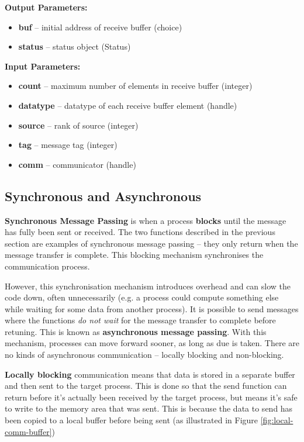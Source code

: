 \documentclass{article}
\begin{document}
\textbf{Output Parameters:}
\begin{itemize}
	\item \textbf{buf} -- initial address of receive buffer (choice)
	\item \textbf{status} -- status object (Status)
\end{itemize}
\textbf{Input Parameters:}
\begin{itemize}
	\item \textbf{count} -- maximum number of elements in receive buffer (integer)
	\item \textbf{datatype} -- datatype of each receive buffer element (handle)
	\item \textbf{source} -- rank of source (integer)
	\item \textbf{tag} -- message tag (integer)
	\item \textbf{comm} -- communicator (handle)
\end{itemize}

\subsection{Synchronous and Asynchronous}

\textbf{Synchronous Message Passing} is when a process \textbf{blocks} until the message has fully been sent or received. The two functions described in the previous section are examples of synchronous message passing -- they only return when the message transfer is complete. This blocking mechanism synchronises the communication process.

However, this synchronisation mechanism introduces overhead and can slow the code down, often unnecessarily (e.g. a process could compute something else while waiting for some data from another process). It is possible to send messages where the functions \textit{do not wait} for the message transfer to complete before retuning. This is known as \textbf{asynchronous message passing}. With this mechanism, processes can move forward sooner, as long as due is taken. There are no kinds of asynchronous communication -- locally blocking and non-blocking.

\textbf{Locally blocking} communication means that data is stored in a separate buffer and then sent to the target process. This is done so that the send function can return before it's actually been received by the target process, but means it's safe to write to the memory area that was sent. This is because the data to send has been copied to a local buffer before being sent (as illustrated in Figure \ref{fig:local-comm-buffer})
\end{document}
